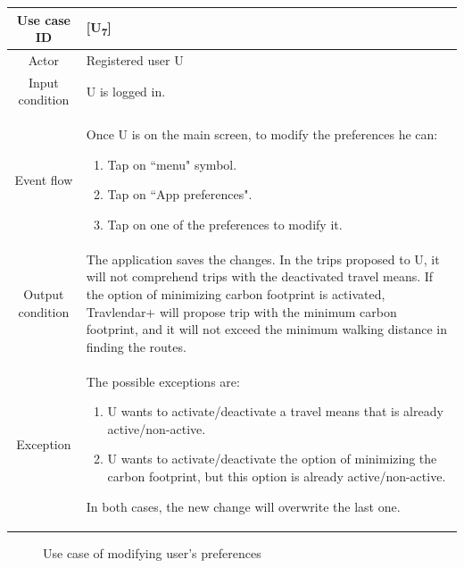 \documentclass[12pt,titlepage]{article}
\begin{document}
\begin{tabular}{cp{10cm}} 
Use case ID& {[U\textsubscript{7}]}\\ \hline
Actor&Registered user U \\ \hline 

Input condition&U is logged in.\\ \hline
Event flow&Once U is on the main screen, to modify the preferences he can:
\begin{enumerate}
\item Tap on ``menu" symbol.
\item Tap on ``App preferences".
\item Tap on one of the preferences to modify it.
\end{enumerate} 
\\ \hline
Output condition& The application saves the changes. In the trips proposed to U, it will not comprehend trips with the deactivated travel means. If the option of minimizing carbon footprint is activated, Travlendar+ will propose trip with the minimum carbon footprint, and it will not exceed the minimum walking distance in finding the routes. \\ \hline
Exception& The possible exceptions are:
\begin{enumerate}
\item U wants to activate/deactivate a travel means that is already active/non-active.
\item U wants to activate/deactivate the option of minimizing the carbon footprint, but this option is already active/non-active.
\end{enumerate}
In both cases, the new change will overwrite the last one.\\ \hline 

\end{tabular}
\pagebreak 
\begin{figure}
\centering
{}
\caption{Use case of modifying user's preferences}
\end{figure}
\end{document}
